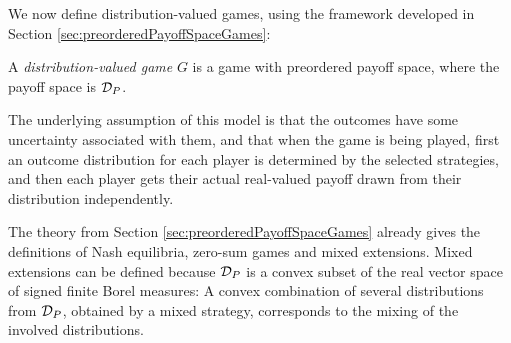 \documentclass[a4paper]{scrreprt}
\begin{document}

    We now define distribution-valued games, using the framework developed in Section \ref{sec:preorderedPayoffSpaceGames}:
    \begin{defn}
        A \emph{distribution-valued game} $G$ is a game with preordered payoff space, where the payoff space is $\mathcal{D}_P$.
    \end{defn}
    The underlying assumption of this model is that the outcomes have some uncertainty associated with them, and that when the game is being played, first an outcome distribution for each player is determined by the selected strategies, and then each player gets their actual real-valued payoff drawn from their distribution independently.

    The theory from Section \ref{sec:preorderedPayoffSpaceGames} already gives the definitions of Nash equilibria, zero-sum games and mixed extensions. 
    Mixed extensions can be defined because $\mathcal{D}_P$ is a convex subset of the real vector space of signed finite Borel measures: A convex combination of several distributions from $\mathcal{D}_P$, obtained by a mixed strategy, corresponds to the mixing of the involved distributions.
    
\end{document}
